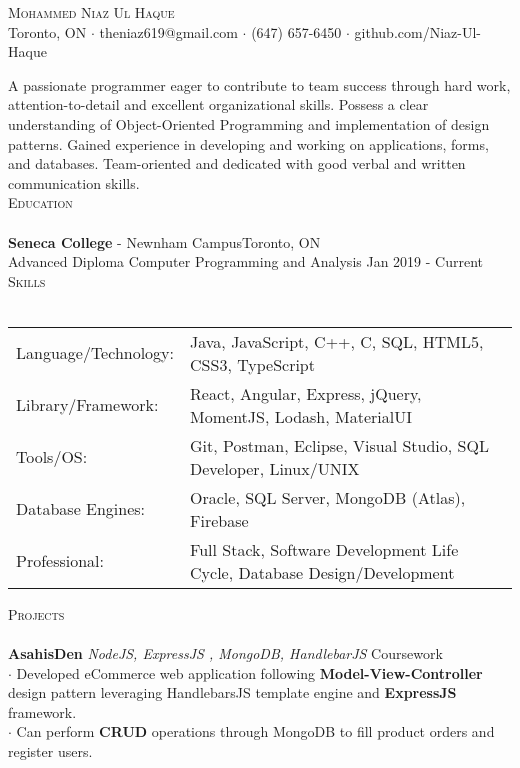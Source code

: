 \documentclass[a4paper]{article}
\newcommand{\lineunder} {
    \vspace*{-8pt} \\
    \hspace*{-18pt} \hrulefill \\
}
\newcommand{\header} [1] {
    {\hspace*{-18pt}\vspace*{6pt} \textsc{#1}}
    \vspace*{-6pt} \lineunder
}
\begin{document}
\vspace*{-40pt}

    

\vspace*{-10pt}
\begin{center}
	{\Huge \scshape {Mohammed Niaz Ul Haque}}\\
	Toronto, ON $\cdot$ theniaz619@gmail.com $\cdot$ (647) 657-6450 $\cdot$ github.com/Niaz-Ul-Haque\\
\end{center}

\text A passionate programmer eager to contribute to team success through hard work, attention-to-detail and excellent organizational skills. Possess a clear understanding of Object-Oriented Programming and implementation of design patterns. Gained experience in developing and working on applications, forms, and databases. Team-oriented and dedicated with good verbal and written communication skills.\\
\vspace{2mm}
{\large\header{Education}}
\textbf{Seneca College} - Newnham Campus\hfill Toronto, ON\\
{Advanced Diploma} Computer Programming and Analysis \hfill Jan 2019 - Current\\


\vspace{2mm}
{\large\header{Skills}}\vspace{1mm}
\begin{tabular}{ l l  }
	Language/Technology: & Java, JavaScript, C++, C, SQL, HTML5, CSS3, TypeScript  \\
	Library/Framework:   & React, Angular, Express, jQuery, MomentJS, Lodash, MaterialUI \\
	Tools/OS:               & Git, Postman, Eclipse, Visual Studio, SQL Developer, Linux/UNIX  \\
	Database Engines:      & Oracle, SQL Server, MongoDB (Atlas), Firebase                            \\
	Professional:      & Full Stack, Software Development Life Cycle, Database Design/Development 
                            \\
\end{tabular}
\vspace{0.3mm}

{\large\header{Projects}}\vspace{0.3mm}
{\textbf{AsahisDen}} {\sl NodeJS, ExpressJS , MongoDB, HandlebarJS} \hfill Coursework\\
$\cdot$ Developed eCommerce web application following {\textbf{Model-View-Controller}} design pattern leveraging HandlebarsJS template engine and {\textbf{ExpressJS}} framework.\\
$\cdot$ Can perform {\textbf{CRUD}} operations through MongoDB to fill product orders and register users.\\
\vspace*{2mm}
\end{document}

